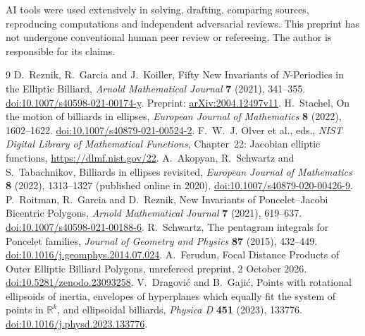 \documentclass[11pt]{article}
\begin{document}
AI tools were used extensively in solving, drafting, comparing
sources, reproducing computations and independent adversarial
reviews. This preprint has not undergone conventional human peer
review or refereeing. The author is responsible for its claims.

\begin{thebibliography}{9}
 D.~Reznik, R.~Garcia and J.~Koiller,
Fifty New Invariants of \(N\)-Periodics in the Elliptic Billiard,
\emph{Arnold Mathematical Journal} \textbf{7} (2021), 341--355.
\href{https://doi.org/10.1007/s40598-021-00174-y}{doi:10.1007/s40598-021-00174-y}.
Preprint: \href{https://arxiv.org/abs/2004.12497v11}{arXiv:2004.12497v11}.
 H.~Stachel, On the motion of billiards in ellipses,
\emph{European Journal of Mathematics} \textbf{8} (2022), 1602--1622.
\href{https://doi.org/10.1007/s40879-021-00524-2}{doi:10.1007/s40879-021-00524-2}.
 F.~W.~J. Olver et al., eds.,
\emph{NIST Digital Library of Mathematical Functions},
Chapter~22: Jacobian elliptic functions,
\url{https://dlmf.nist.gov/22}.
 A.~Akopyan, R.~Schwartz and S.~Tabachnikov,
Billiards in ellipses revisited,
\emph{European Journal of Mathematics} \textbf{8} (2022), 1313--1327
(published online in 2020).
\href{https://doi.org/10.1007/s40879-020-00426-9}{doi:10.1007/s40879-020-00426-9}.
 P.~Roitman, R.~Garcia and D.~Reznik,
New Invariants of Poncelet--Jacobi Bicentric Polygons,
\emph{Arnold Mathematical Journal} \textbf{7} (2021), 619--637.
\href{https://doi.org/10.1007/s40598-021-00188-6}{doi:10.1007/s40598-021-00188-6}.
 R.~Schwartz,
The pentagram integrals for Poncelet families,
\emph{Journal of Geometry and Physics} \textbf{87} (2015), 432--449.
\href{https://doi.org/10.1016/j.geomphys.2014.07.024}{doi:10.1016/j.geomphys.2014.07.024}.
 A.~Ferudun,
Focal Distance Products of Outer Elliptic Billiard Polygons,
unrefereed preprint, 2 October 2026.
\href{https://doi.org/10.5281/zenodo.23093258}{doi:10.5281/zenodo.23093258}.
 V.~Dragovi\'c and B.~Gaji\'c,
Points with rotational ellipsoids of inertia, envelopes of hyperplanes
which equally fit the system of points in \(\mathbb R^k\), and ellipsoidal billiards,
\emph{Physica D} \textbf{451} (2023), 133776.
\href{https://doi.org/10.1016/j.physd.2023.133776}{doi:10.1016/j.physd.2023.133776}.
\end{thebibliography}
\end{document}
